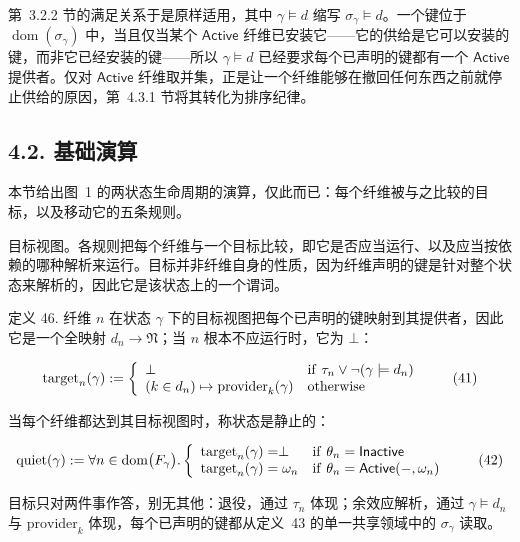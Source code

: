 第~3.2.2 节的满足关系于是原样适用，其中 \(\gamma \models d\) 缩写 \(\sigma _ { \gamma } \models d\)。一个键位于 \(\operatorname { d o m } \left( \sigma _ { \gamma } \right)\) 中，当且仅当某个 $\mathsf { A c t i v e }$ 纤维已安装它——它的供给是它可以安装的键，而非它已经安装的键——所以 \(\gamma \models d\) 已经要求每个已声明的键都有一个 $\mathsf { A c t i v e }$ 提供者。仅对 $\mathsf { A c t i v e }$ 纤维取并集，正是让一个纤维能够在撤回任何东西之前就停止供给的原因，第~4.3.1 节将其转化为排序纪律。

\subsection{4.2. 基础演算}\label{the-base-calculus}

本节给出图~1 的两状态生命周期的演算，仅此而已：每个纤维被与之比较的目标，以及移动它的五条规则。

目标视图。各规则把每个纤维与一个目标比较，即它是否应当运行、以及应当按依赖的哪种解析来运行。目标并非纤维自身的性质，因为纤维声明的键是针对整个状态来解析的，因此它是该状态上的一个谓词。

定义 46. 纤维 $n$ 在状态 $\gamma$ 下的目标视图把每个已声明的键映射到其提供者，因此它是一个全映射 \(d _ { n } \to \mathfrak { N }\)；当 $n$ 根本不应运行时，它为 $\bot$：

\[
\mathrm { t a r g e t } _ { n } ( \gamma ) : = \left\{ \begin{array} { l l } { \hfill \perp } & { \mathrm { i f } \ \tau _ { n } \vee \neg ( \gamma \models d _ { n } ) } \\ { \hfill ( k \in d _ { n } ) \mapsto \mathrm { p r o v i d e r } _ { k } ( \gamma ) } & { \mathrm { o t h e r w i s e } } \end{array} \right.\tag{41}
\]

当每个纤维都达到其目标视图时，称状态是静止的：

\[
\operatorname { q u i e t } ( \gamma ) : = \forall n \in \operatorname { d o m } \bigl ( F _ { \gamma } \bigr ) . \left\{ \begin{array} { l l } { \operatorname { t a r g e t } _ { n } ( \gamma ) = \perp } & { \mathrm { i f ~ } \theta _ { n } = \mathsf { I n a c t i v e } } \\ { \operatorname { t a r g e t } _ { n } ( \gamma ) = \omega _ { n } } & { \mathrm { i f ~ } \theta _ { n } = \mathsf { A c t i v e } ( - , \omega _ { n } ) } \end{array} \right.\tag{42}
\]

目标只对两件事作答，别无其他：退役，通过 \(\tau _ { n }\) 体现；余效应解析，通过 \(\gamma \models d _ { n }\) 与 \(\mathrm { p r o v i d e r } _ { k }\) 体现，每个已声明的键都从定义~43 的单一共享领域中的 \(\sigma _ { \gamma }\) 读取。

